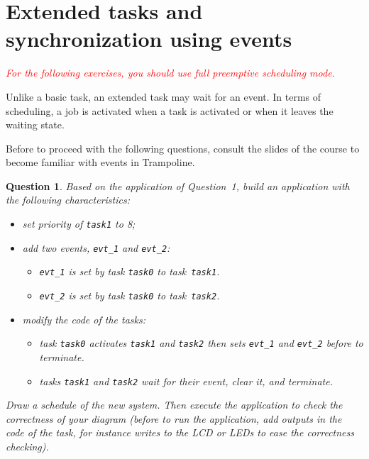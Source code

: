 \documentclass[11pt]{report}
\newtheorem{ex}{Question}
\begin{document}
\section{Extended tasks and synchronization using events}

\textcolor{red}{\emph{For the following exercises, you should use full preemptive scheduling mode.}}

Unlike a basic task, an extended task may wait for an event.
In terms of scheduling, a job is activated when a task is activated or when it leaves the waiting state.

Before to proceed with the following questions, consult the slides of the course to become familiar with events in Trampoline.


\begin{ex}
     Based on the application of Question~1, build an application with the following characteristics:
\begin{itemize}
    \item set priority of \texttt{task1} to 8;
    \item add two events, \texttt{evt\_1} and \texttt{evt\_2}:
        \begin{itemize}
            \item \texttt{evt\_1} is set by task \texttt{task0} to task \texttt{task1}.
            \item \texttt{evt\_2} is set by task \texttt{task0} to task \texttt{task2}.
        \end{itemize}
    \item modify the code of the tasks:
        \begin{itemize}
            \item task \texttt{task0} activates \texttt{task1} and \texttt{task2} then sets \texttt{evt\_1} and \texttt{evt\_2} before to terminate.
            \item tasks \texttt{task1} and \texttt{task2} wait for their event, clear it, and terminate.
        \end{itemize}
\end{itemize}

Draw a schedule of the new system.
Then execute the application to check the correctness of your diagram (before to run the application, add outputs in the code of the task, for instance writes to the LCD or LEDs to ease the correctness checking).

\end{ex}
\end{document}
